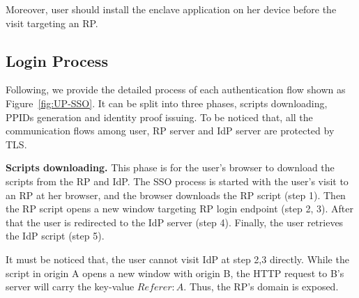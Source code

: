 Moreover, user should install the enclave application on her device before the visit targeting an RP. 

\subsection{Login Process}
Following, we provide the detailed process of each authentication flow shown as Figure~\ref{fig:UP-SSO}.
It can be split into three phases, scripts downloading, PPIDs generation and identity proof issuing. To be noticed that, all the communication flows among user, RP server and IdP server are protected by TLS.

\vspace{0.5mm}\noindent\textbf{Scripts downloading.} This phase is for the user’s browser to download the scripts from the RP and IdP. The SSO process is started with the user's visit to an RP at her browser, and the browser downloads the RP script (step 1). Then the RP script opens a new window targeting RP login endpoint (step 2, 3). After that the user is redirected to the IdP server (step 4). Finally, the user retrieves the IdP script (step 5).

It must be noticed that, the user cannot visit IdP at step 2,3 directly. While the script in origin A opens a new window with origin B, the HTTP request to B's server will carry the key-value $Referer: A$. Thus, the RP's domain is exposed.%


